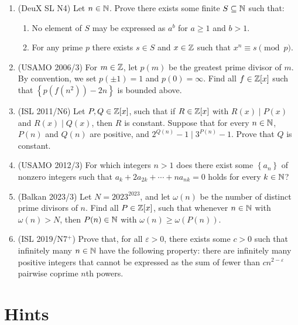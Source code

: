\documentclass[11pt,paper=letter]{scrartcl}
\newcommand{\seq}[1]{\left\{#1\right\}}
\begin{document}
\begin{enumerate}[resume]

\item (DeuX SL N4) Let $n \in \mathbb N$. Prove there exists some finite $S \subseteq \mathbb N$ such that:
\begin{enumerate}
\item No element of $S$ may be expressed as $a^b$ for $a \ge 1$ and $b > 1$.
\item For any prime $p$ there exists $s \in S$ and $x \in \mathbb Z$ such that $x^n \equiv s \pmod p$. \hints{\ref{h:14a} \ref{h:14b}}
\end{enumerate}

\item (USAMO 2006/3) For $m \in \mathbb Z$, let $p(m)$ be the greatest prime divisor of $m$. By convention, we set $p(\pm 1) = 1$ and $p(0) = \infty$. Find all $f \in \mathbb Z[x]$ such that $\seq{p(f(n^2)) - 2n}$ is bounded above. \hints{\ref{h:15a} \ref{h:15b}}

\item (ISL 2011/N6) Let $P, Q \in \mathbb Z[x]$, such that if $R \in \mathbb Z[x]$ with $R(x) \mid P(x)$ and $R(x) \mid Q(x)$, then $R$ is constant. Suppose that for every $n \in \mathbb N$, $P(n)$ and $Q(n)$ are positive, and $2^{Q(n)} - 1 \mid 3^{P(n)} - 1$. Prove that $Q$ is constant. \hints{\ref{h:16a} \ref{h:16b}}

\item (USAMO 2012/3) For which integers $n > 1$ does there exist some $\seq{a_n}$ of nonzero integers such that $a_k + 2a_{2k} + \cdots + na_{nk} = 0$ holds for every $k \in \mathbb N$? \hints{\ref{h:17a} \ref{h:17b}}

\item (Balkan 2023/3) Let $N = 2023^{2023}$, and let $\omega(n)$ be the number of distinct prime divisors of $n$. Find all $P \in \mathbb Z[x]$, such that whenever $n \in \mathbb N$ with $\omega(n)>N$, then $P(n) \in \mathbb N$ with $\omega(n)\ge\omega(P(n))$. \hints{\ref{h:18a} \ref{h:18b} \ref{h:18c}}

\item (ISL 2019/N7$^+$) Prove that, for all $\varepsilon > 0$, there exists some $c > 0$ such that infinitely many $n \in \mathbb N$ have the following property: there are infinitely many positive integers that cannot be expressed as the sum of fewer than $cn^{2 - \varepsilon}$ pairwise coprime $n$th powers. \hints{\ref{h:19a} \ref{h:19b} \ref{h:19c}}
\end{enumerate}

\pagebreak
\section{Hints}
\end{document}
